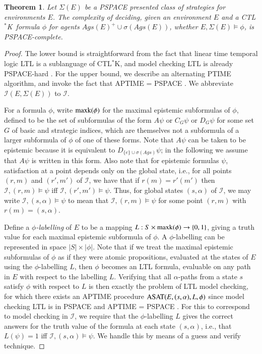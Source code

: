\documentclass[a4wide]{article}
\newcommand{\CTLsK}{\mbox{CTL$^*$K}}
\newtheorem{theorem}{Theorem}
\theoremstyle{examplesty}
\newcommand{\strat}{\sigma}
\newcommand{\Ags}{\mathit{Ags}}
\newcommand{\I}{\mathcal{I}}
\newcommand{\Env}{E}
\newcommand{\Strats}{\Sigma}
\newcommand{\ksubf}{{\rm maxk}}
\newcommand{\ASAT}{{\rm ASAT}}
\begin{document}
\begin{theorem} \label{mcCTLsK}
Let $\Strats(E)$ be a PSPACE presented class of strategies for environments $E$.  
The complexity of deciding, given an environment $E$
and a \CTLsK\ formula $\phi$ for agents 
$\Ags(E)^+ \cup \strat(\Ags(E))$, 
whether $\Env,\Strats(\Env) \models\phi$, is PSPACE-complete. 
\end{theorem}
\begin{proof} The lower bound is straightforward from the fact that linear time temporal logic LTL is a 
sublanguage of \CTLsK, and model checking LTL is already PSPACE-hard \cite{SistlaC85}. 
For the upper bound, we describe an alternating PTIME algorithm, and invoke the fact that APTIME = PSPACE \cite{alternation}. 
We abbreviate $\I(E, \Strats(E))$ to $\I$. 

For a formula $\phi$, write $\ksubf(\phi)$ for the maximal epistemic subformulas of $\phi$, defined to be the 
set of subformulas of the form $A\psi$ or 
$C_G\psi$ or $D_G\psi$ for some set $G$ of basic and strategic 
indices, 
which are themselves not a subformula of a larger subformula of $\phi$ of one of these forms. 
Note that $A\psi$ can be taken to be epistemic because it is equivalent to $D_{\{e\}\cup \strat(\Ags)}\psi$; 
in the following we assume that $A\psi$ is written in this form. 
Also note that for epistemic formulas $\psi$, satisfaction at a point depends 
only on the global state, i.e.,  for all  points $(r,m)$ and $(r',m')$ of $\I$, we have
that if $r(m) = r'(m')$ then $\I, (r, m) \models  \psi$ iff $\I, (r', m') \models  \psi$. 
Thus, for global states $(s,\alpha)$  of 
$\I$,
we may write $\I, (s,\alpha) \models \psi$
to mean that  $\I, (r, m) \models  \psi$ for some point $(r,m)$ with $r(m) = (s, \alpha)$. 

Define a  {\em $\phi$-labelling} of $E$ to be a mapping $L: S\times \ksubf(\phi) \rightarrow \{0,1\}$, 
giving a truth value for each maximal epistemic subformula of $\phi$. 
A $\phi$-labelling can be represented in space $|S|\times |\phi|$. 
Note that if we treat the maximal epistemic subformulas of $\phi$ as if they were atomic 
propositions, evaluated at the states of $E$ using the $\phi$-labelling $L$, 
then $\phi$ becomes an LTL formula, evaluable on any path in $E$ 
with respect to the labelling $L$. 
Verifying that all $\alpha$-paths from a state $s$ satisfy $\phi$ with respect to $L$ 
is then exactly the problem of LTL model checking, for which there exists an 
APTIME procedure $\ASAT(E,(s, \alpha), L, \phi)$
since model checking LTL is in PSPACE \cite{SistlaC85} and APTIME = PSPACE \cite{alternation}. 
For this to correspond to model checking in $\I$, 
we require that 
the $\phi$-labelling 
$L$ gives the correct answers for the truth value of the formula
at each state $(s,\alpha)$, i.e., 
that $L(\psi) = 1$ iff $\I, (s,\alpha) \models \psi$. 
 We handle this by means of a guess and verify technique. 


\end{proof}
\end{document}
